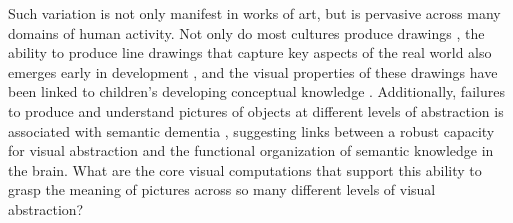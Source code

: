 \documentclass[10pt,letterpaper]{article}
\begin{document}
Such variation is not only manifest in works of art, but is pervasive across many domains of human activity. 
Not only do most cultures produce drawings \cite{gombrich1995story}, the ability to produce line drawings that capture key aspects of the real world also emerges early in development \cite{karmiloff1990constraints, dillon2021rooms, long2021parallel}, and the visual properties of these drawings have been linked to children's developing conceptual knowledge \cite{tversky1989parts,huey2022developmental}. 
Additionally, failures to produce and understand pictures of objects at different levels of abstraction is associated with semantic dementia \cite{bozeat2003duck, rogers2007object}, suggesting links between a robust capacity for visual abstraction and the functional organization of semantic knowledge in the brain. 
What are the core visual computations that support this ability to grasp the meaning of pictures across so many different levels of visual abstraction? 
\end{document}
